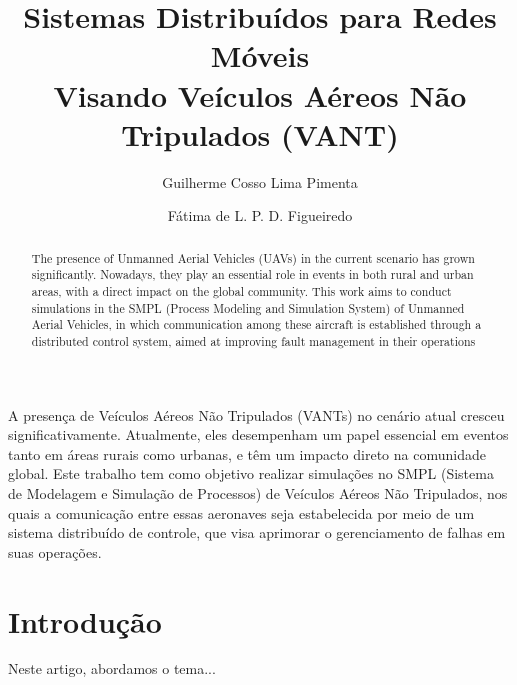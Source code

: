 \documentclass[15pt]{article}
\title{Sistemas Distribuídos para Redes Móveis \\ Visando Veículos Aéreos Não Tripulados (VANT)}
\author{Guilherme Cosso Lima Pimenta\inst{1} \and Fátima de L. P. D. Figueiredo\inst{2}}
\begin{document}
 

\maketitle

\begin{abstract}
\par The presence of Unmanned Aerial Vehicles (UAVs) in the current scenario has grown significantly. Nowadays, they play an essential role in events in both rural and urban areas, with a direct impact on the global community. This work aims to conduct simulations in the SMPL (Process Modeling and Simulation System) of Unmanned Aerial Vehicles, in which communication among these aircraft is established through a distributed control system, aimed at improving fault management in their operations

    
\end{abstract} 



\begin{resumo} 

\par A presença de Veículos Aéreos Não Tripulados (VANTs) no cenário atual cresceu significativamente. Atualmente, eles desempenham um papel essencial em eventos tanto em áreas rurais como urbanas, e têm um impacto direto na comunidade global. Este trabalho tem como objetivo realizar simulações no SMPL (Sistema de Modelagem e Simulação de Processos) de Veículos Aéreos Não Tripulados, nos quais a comunicação entre essas aeronaves seja estabelecida por meio de um sistema distribuído de controle, que visa aprimorar o gerenciamento de falhas em suas operações.

\end{resumo}

\section{Introdução}
Neste artigo, abordamos o tema...
\end{document}
